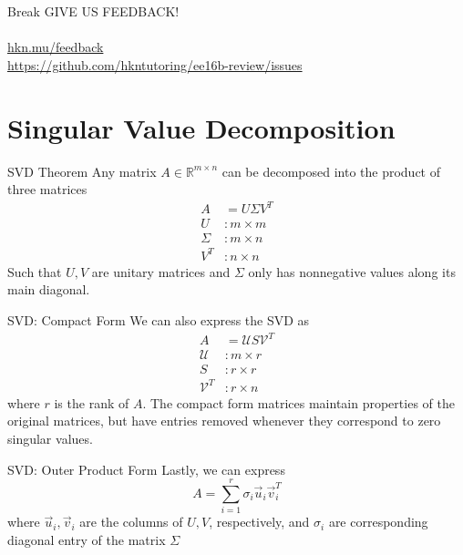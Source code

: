 \documentclass{beamer}
\begin{document}
\begin{frame}{Break}
    \Large{GIVE US FEEDBACK!\\\vspace{2em}\\\url{hkn.mu/feedback}\\\url{https://github.com/hkntutoring/ee16b-review/issues} }
\end{frame}

	\section[SVD]{Singular Value Decomposition}

    \begin{frame}{SVD Theorem}
Any matrix $A \in \mathbb{R}^{m \times n}$ can be decomposed into the product of three matrices
		\begin{align*}
			A &= U \Sigma V^T \\
			U &: m \times m \\
			\Sigma &: m \times n \\
			V^T &: n \times n
		\end{align*}
		Such that $U, V$ are unitary matrices and $\Sigma$ only has nonnegative values along its main diagonal.

    \end{frame}

    \begin{frame}{SVD: Compact Form}
        We can also express the SVD as
		\begin{align*}
			A &= \mathcal{U} S \mathcal{V}^T \\
			\mathcal{U} &: m \times r \\
			S &: r \times r \\
			\mathcal{V}^T &: r \times n
		\end{align*}
		where $r$ is the rank of $A$. The compact form matrices maintain properties of the original matrices, but have entries removed whenever they correspond to zero singular values.

    \end{frame}


    \begin{frame}{SVD: Outer Product Form}
		Lastly, we can express
		\[ A = \sum_{i = 1}^r \sigma_i \vec{u}_i \vec{v}_i^T \]
		where $\vec{u}_i, \vec{v}_i$ are the columns of $U, V$, respectively, and $\sigma_i$ are corresponding diagonal entry of the matrix $\Sigma$
    \end{frame}
\end{document}

